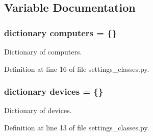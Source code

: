 \subsection{\-Variable \-Documentation}
\hypertarget{namespacesettings__classes_abdbbd72da73285ea3f5115c9853b6792}{
\subsubsection[{computers}]{\setlength{\rightskip}{0pt plus 5cm}dictionary {\bf computers} = \{\}}}\label{namespacesettings__classes_abdbbd72da73285ea3f5115c9853b6792}


\-Dictionary of computers. 



\-Definition at line 16 of file settings\-\_\-classes.\-py.

\hypertarget{namespacesettings__classes_ad576a95c9c6a09a6b589dcb7c67b5c6d}{
\subsubsection[{devices}]{\setlength{\rightskip}{0pt plus 5cm}dictionary {\bf devices} = \{\}}}\label{namespacesettings__classes_ad576a95c9c6a09a6b589dcb7c67b5c6d}


\-Dictionary of devices. 



\-Definition at line 13 of file settings\-\_\-classes.\-py.

